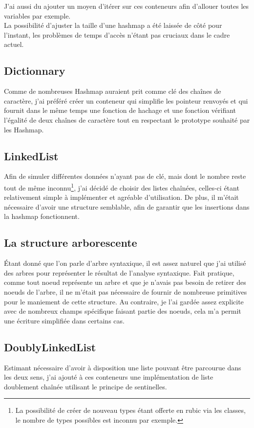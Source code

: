 \documentclass[12pt]{article}
\begin{document}
J'ai aussi du ajouter un moyen d'itérer sur ces conteneurs afin d'allouer
toutes les variables par exemple.\\

La possibilité d'ajuster la taille d'une hashmap a été laissée de côté
pour l'instant, les problèmes de temps d'accès n'étant pas cruciaux dans le
cadre actuel.

\subsection{Dictionnary}
Comme de nombreuses Hashmap auraient prit comme clé des chaînes de caractère,
j'ai préféré créer un conteneur qui simplifie les pointeur renvoyés et
qui fournit dans le même temps une fonction de hachage et une fonction
vérifiant l'égalité de deux chaînes de caractère tout en respectant le
prototype souhaité par les Hashmap.

\subsection{LinkedList}
Afin de simuler différentes données n'ayant pas de clé, mais dont le nombre
reste tout de même inconnu\footnote{La possibilité de créer de nouveau types
étant offerte en rubic via les classes, le nombre de types possibles est
inconnu par exemple.}, j'ai décidé de choisir des listes chaînées, celles-ci
étant relativement simple à implémenter et agréable d'utilisation. De plus,
il m'était nécessaire d'avoir une structure semblable, afin de garantir que
les insertions dans la hashmap fonctionnent.

\subsection{La structure arborescente}
Étant donné que l'on parle d'arbre syntaxique, il est assez naturel que j'ai
utilisé des arbres pour représenter le résultat de l'analyse syntaxique. Fait
pratique, comme tout noeud représente un arbre et que je n'avais pas besoin
de retirer des noeuds de l'arbre, il ne m'était pas nécessaire de fournir
de nombreuse primitives pour le maniement de cette structure. Au contraire,
je l'ai gardée assez explicite avec de nombreux champs spécifique faisant
partie des noeuds, cela m'a permit une écriture simplifiée dans certains cas.

\subsection{DoublyLinkedList}
Estimant nécessaire d'avoir à disposition une liste pouvant être parcourue
dans les deux sens, j'ai ajouté à ces conteneurs une implémentation de liste
doublement chaînée utilisant le principe de sentinelles.\\
\end{document}
